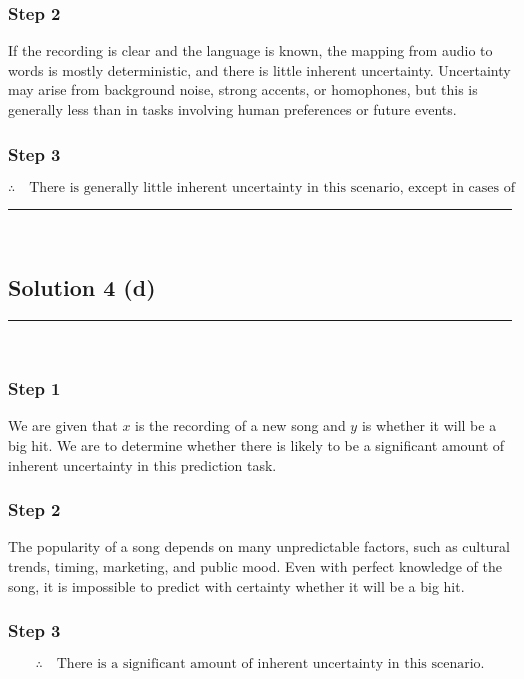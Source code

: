 \documentclass{article}
\begin{document}
\subsubsection*{Step 2}
\parbox{\textwidth}{
If the recording is clear and the language is known, the mapping from audio to words is mostly deterministic, and there is little inherent uncertainty. Uncertainty may arise from background noise, strong accents, or homophones, but this is generally less than in tasks involving human preferences or future events.
}

\subsubsection*{Step 3}
\parbox{\textwidth}{
\[
\therefore \quad \text{There is generally little inherent uncertainty in this scenario, except in cases of poor audio quality or ambiguity.}
\]
}

\noindent\rule{\textwidth}{0.4pt}\\

\newpage

\subsection*{Solution 4 (d)}
\noindent\rule{\textwidth}{0.4pt}\\

\subsubsection*{Step 1}
\parbox{\textwidth}{
We are given that $x$ is the recording of a new song and $y$ is whether it will be a big hit. We are to determine whether there is likely to be a significant amount of inherent uncertainty in this prediction task.
}

\subsubsection*{Step 2}
\parbox{\textwidth}{
The popularity of a song depends on many unpredictable factors, such as cultural trends, timing, marketing, and public mood. Even with perfect knowledge of the song, it is impossible to predict with certainty whether it will be a big hit.
}

\subsubsection*{Step 3}
\parbox{\textwidth}{
\[
\therefore \quad \text{There is a significant amount of inherent uncertainty in this scenario.}
\]
}
\end{document}

